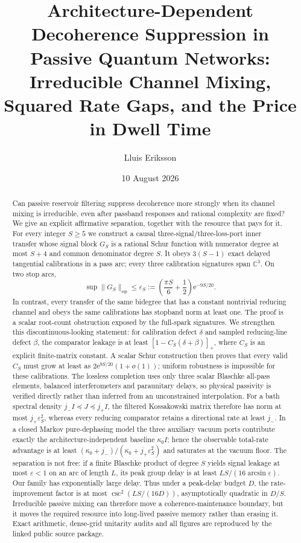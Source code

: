 \documentclass[11pt]{article}
\title{Architecture-Dependent Decoherence Suppression in Passive Quantum Networks:\\
Irreducible Channel Mixing, Squared Rate Gaps, and the Price in Dwell Time}
\author{Lluis Eriksson}
\date{10 August 2026}
\theoremstyle{definition}
\theoremstyle{remark}
\newcommand{\C}{\mathbb{C}}
\newcommand{\op}{\mathrm{op}}
\newcommand{\e}{\mathrm{e}}
\begin{document}
\maketitle

\begin{abstract}
Can passive reservoir filtering suppress decoherence more strongly when its
channel mixing is irreducible, even after passband responses and rational
complexity are fixed?  We give an explicit affirmative separation, together
with the resource that pays for it.  For every integer $S\geq5$ we construct a
causal three-signal/three-loss-port inner transfer whose signal block $G_S$ is
a rational Schur function with numerator degree at most $S+4$ and common
denominator degree $S$.  It obeys $3(S-1)$ exact delayed tangential
calibrations in a pass arc; every three calibration signatures span $\C^3$.
On two stop arcs,
\[
\sup\|G_S\|_{\op}\leq
 \varepsilon_S:=\left(\frac{\pi S}{6}+\frac12\right)\e^{-9S/20}.
\]
In contrast, every transfer of the same bidegree that has a constant
nontrivial reducing channel and obeys the same calibrations has stopband norm
at least one.  The proof is a scalar root-count obstruction exposed by the
full-spark signatures.  We strengthen this discontinuous-looking statement:
for calibration defect $\delta$ and sampled reducing-line defect $\beta$, the
comparator leakage is at least $[1-C_S(\delta+\beta)]_+$, where $C_S$ is an
explicit finite-matrix constant.  A scalar Schur construction then proves
that every valid $C_S$ must grow at least as $2\e^{9S/20}(1+o(1))$; uniform
robustness is impossible for these calibrations.  The lossless completion uses only three scalar
Blaschke all-pass elements, balanced interferometers and paraunitary delays,
so physical passivity is verified directly rather than inferred from an
unconstrained interpolation.  For a bath spectral density
$j_-I\preceq J\preceq j_+I$, the filtered Kossakowski matrix therefore has
norm at most $j_+\varepsilon_S^2$, whereas every reducing comparator retains a
directional rate at least $j_-$.  In a closed Markov pure-dephasing model the
three auxiliary vacuum ports contribute exactly the architecture-independent
baseline $\kappa_0I$; hence the observable total-rate advantage is at least
$(\kappa_0+j_-)/(\kappa_0+j_+\varepsilon_S^2)$ and saturates at the vacuum
floor.  The separation is not free: if a finite Blaschke product of
degree $S$ yields signal leakage at most $\varepsilon<1$ on an arc of length
$L$, its peak group delay is at least
$LS/(16\arcsin\varepsilon)$.  Our family has exponentially large delay.  Thus
under a peak-delay budget $D$, the rate-improvement factor is at most
$\csc^2(LS/(16D))$, asymptotically quadratic in $D/S$.  Irreducible passive
mixing can therefore move a coherence-maintenance boundary, but it
moves the required resource into long-lived passive memory rather than
erasing it.  Exact arithmetic, dense-grid unitarity audits and all figures are
reproduced by the linked public source package.
\end{abstract}
\end{document}
